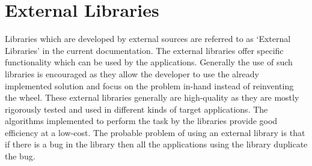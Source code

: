 \section{External Libraries}

Libraries which are developed by external sources are referred to as {\lq}External Libraries{\rq} in the current documentation. The external libraries offer specific functionality which can be used by the applications. Generally the use of such libraries is encouraged as they allow the developer to use the already implemented solution and focus on the problem in-hand instead of reinventing the wheel. These external libraries generally are high-quality as they are mostly rigorously tested and used in different kinds of target applications. The algorithms implemented to perform the task by the libraries provide good efficiency at a low-cost. The probable problem of using an external library is that if there is a bug in the library then all the applications using the library duplicate the bug. \newline


